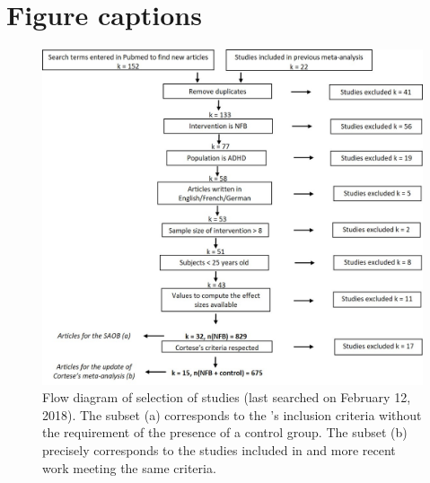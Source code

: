 \section*{Figure captions}

\begin{figure}[h!]
  \centering
	\includegraphics[width=1.0\linewidth]{figures/meta_review_factors_analysis_how_studies_are_included_no_colors_2-columns_fitting_ima.jpg} 
  \caption{Flow diagram of selection of studies (last searched on February 12, 2018).  
	The subset (a) corresponds to the \citeauthor{Cortese2016}'s inclusion criteria without the requirement of 
	the presence of a control group.
	The subset (b) precisely corresponds to the studies included in \citet{Cortese2016} and more recent work meeting the same criteria.}
  \label{Figure:systematic_review_workflow}
\end{figure}

